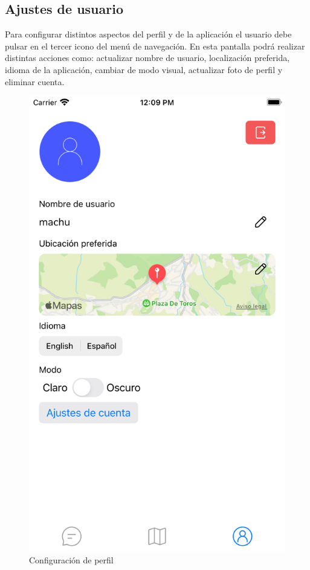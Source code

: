\begin{appendices}
\section{Ajustes de usuario}
Para configurar distintos aspectos del perfil y de la aplicación el usuario debe pulsar en el tercer icono del menú de navegación. En esta pantalla podrá realizar distintas acciones como: actualizar nombre de usuario, localización preferida, idioma de la aplicación, cambiar de modo visual, actualizar foto de perfil y eliminar cuenta.
\begin{figure}[H]
        \centering
        \includegraphics[cframe=black 2pt,width=0.3\linewidth]{images/manual/confPerfil.png}
        \caption{Configuración de perfil}
        \label{fig:my_label}
\end{figure}


\end{appendices}
